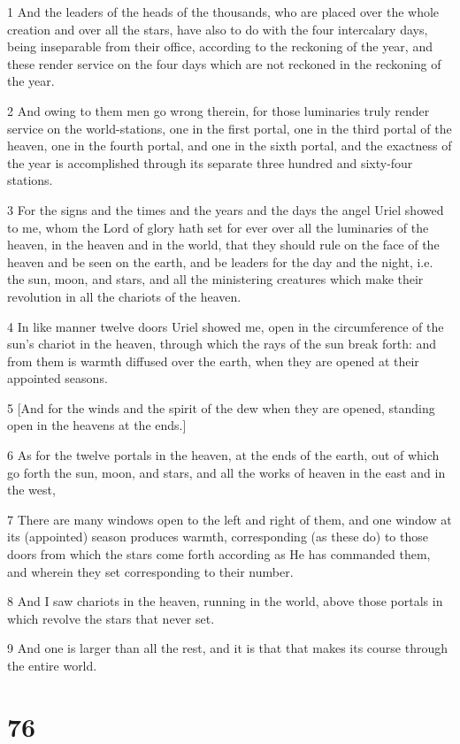\par 1 And the leaders of the heads of the thousands, who are placed over the whole creation and over all the stars, have also to do with the four intercalary days, being inseparable from their office, according to the reckoning of the year, and these render service on the four days which are not reckoned in the reckoning of the year.
\par 2 And owing to them men go wrong therein, for those luminaries truly render service on the world-stations, one in the first portal, one in the third portal of the heaven, one in the fourth portal, and one in the sixth portal, and the exactness of the year is accomplished through its separate three hundred and sixty-four stations.
\par 3 For the signs and the times and the years and the days the angel Uriel showed to me, whom the Lord of glory hath set for ever over all the luminaries of the heaven, in the heaven and in the world, that they should rule on the face of the heaven and be seen on the earth, and be leaders for the day and the night, i.e. the sun, moon, and stars, and all the ministering creatures which make their revolution in all the chariots of the heaven.
\par 4 In like manner twelve doors Uriel showed me, open in the circumference of the sun's chariot in the heaven, through which the rays of the sun break forth: and from them is warmth diffused over the earth, when they are opened at their appointed seasons.
\par 5 [And for the winds and the spirit of the dew when they are opened, standing open in the heavens at the ends.]
\par 6 As for the twelve portals in the heaven, at the ends of the earth, out of which go forth the sun, moon, and stars, and all the works of heaven in the east and in the west,
\par 7 There are many windows open to the left and right of them, and one window at its (appointed) season produces warmth, corresponding (as these do) to those doors from which the stars come forth according as He has commanded them, and wherein they set corresponding to their number.
\par 8 And I saw chariots in the heaven, running in the world, above those portals in which revolve the stars that never set.
\par 9 And one is larger than all the rest, and it is that that makes its course through the entire world.

\chapter{76}

